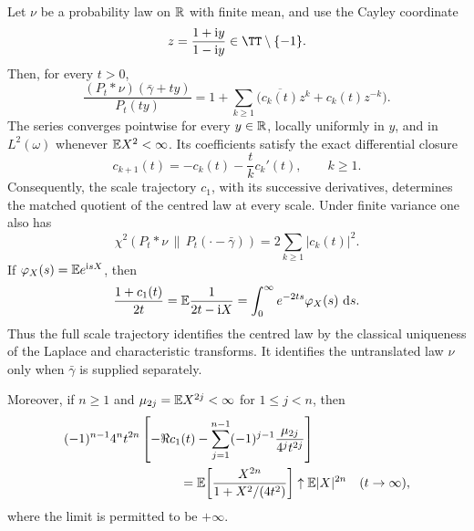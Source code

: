 \begin{theorem}
\label{thm:first-cayley-mode-closure}
Let \(\nu\) be a probability law on \(\mathbb{R}\) with finite mean, and use the
Cayley coordinate
\[
 z=\frac{1+\ii y}{1-\ii y}\in\TT\setminus\{-1\}.
\]
Then, for every \(t>0\),
\begin{equation}\label{eq:first-channel-exact-fourier-series}
 \frac{(P_t*\nu)(\bar\gamma+ty)}{P_t(ty)}
 =1+\sum_{k\ge1}
 \bigl(\overline{c_k(t)}z^k+c_k(t)z^{-k}\bigr).
\end{equation}
The series converges pointwise for every \(y\in\mathbb{R}\), locally uniformly in
\(y\), and in \(L^2(\omega)\) whenever \(\mathbb{E} X^2<\infty\).  Its coefficients
satisfy the exact differential closure
\begin{equation}\label{eq:first-channel-differential-closure}
 c_{k+1}(t)=-c_k(t)-\frac{t}{k}c_k'(t),
 \qquad k\ge1.
\end{equation}
Consequently, the scale trajectory \(c_1\), with its successive derivatives,
determines the matched quotient of the centred law at every scale.  Under
finite variance one also has
\begin{equation}\label{eq:first-channel-chi-square-parseval}
 \chi^2\!\left(P_t*\nu\,\middle\|\,
 P_t(\mathord\cdot-\bar\gamma)\right)
 =2\sum_{k\ge1}|c_k(t)|^2.
\end{equation}
If \(\varphi_X(s)=\mathbb{E} e^{\mathrm{i} sX}\), then
\begin{equation}\label{eq:first-channel-laplace-resolvent}
 \frac{1+c_1(t)}{2t}
 =\mathbb{E}\frac1{2t-\mathrm{i} X}
 =\int_0^\infty e^{-2ts}\varphi_X(s)\,\,\mathrm{d} s.
\end{equation}
Thus the full scale trajectory identifies the centred law by the classical
uniqueness of the Laplace and characteristic transforms.  It identifies the
untranslated law \(\nu\) only when \(\bar\gamma\) is supplied separately.

Moreover, if \(n\ge1\) and \(\mu_{2j}=\mathbb{E} X^{2j}<\infty\) for
\(1\le j<n\), then
\begin{equation}\label{eq:first-channel-even-moment-remainder}
\begin{aligned}
 &(-1)^{n-1}4^nt^{2n}
 \left[-\Re c_1(t)-\sum_{j=1}^{n-1}
 (-1)^{j-1}\frac{\mu_{2j}}{4^jt^{2j}}\right]\\
 &\hspace{32mm}
 =\EE\!\left[\frac{X^{2n}}{1+X^2/(4t^2)}\right]
 \uparrow\EE|X|^{2n}
 \quad(t\to\infty),
\end{aligned}
\end{equation}
where the limit is permitted to be \(+\infty\).
\end{theorem}

